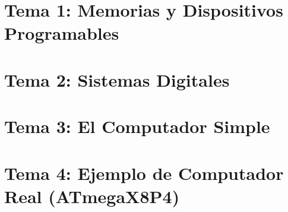 \renewcommand{\contentsname}{Indice}
\tableofcontents
\newpage
\section{Tema 1: Memorias y Dispositivos Programables}

\newpage
\section{Tema 2: Sistemas Digitales}

\newpage
\section{Tema 3: El Computador Simple}

\newpage
\section{Tema 4: Ejemplo de Computador Real (ATmegaX8P4)}
